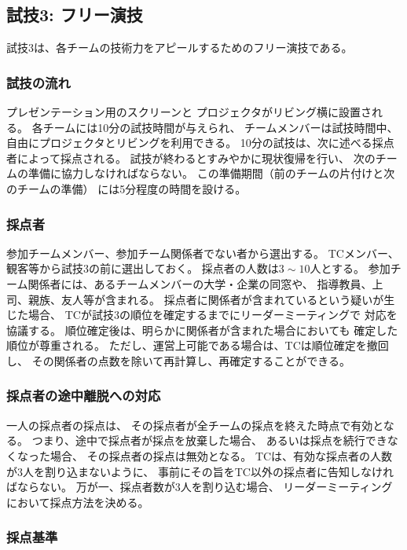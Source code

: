 \documentclass[a4j]{jarticle}
\begin{document}
\subsection{試技3: フリー演技}

試技3は、各チームの技術力をアピールするためのフリー演技である。

\subsubsection{試技の流れ}

プレゼンテーション用のスクリーンと
プロジェクタがリビング横に設置される。
各チームには10分の試技時間が与えられ、
チームメンバーは試技時間中、
自由にプロジェクタとリビングを利用できる。
10分の試技は、次に述べる採点者によって採点される。
試技が終わるとすみやかに現状復帰を行い、
次のチームの準備に協力しなければならない。
この準備期間（前のチームの片付けと次のチームの準備）
には5分程度の時間を設ける。

\subsubsection{採点者}

参加チームメンバー、参加チーム関係者でない者から選出する。
TCメンバー、観客等から試技3の前に選出しておく。
採点者の人数は$3\sim10$人とする。
参加チーム関係者には、あるチームメンバーの大学・企業の同窓や、
指導教員、上司、親族、友人等が含まれる。
採点者に関係者が含まれているという疑いが生じた場合、
TCが試技3の順位を確定するまでにリーダーミーティングで
対応を協議する。
順位確定後は、明らかに関係者が含まれた場合においても
確定した順位が尊重される。
ただし、運営上可能である場合は、TCは順位確定を撤回し、
その関係者の点数を除いて再計算し、再確定することができる。

\subsubsection{採点者の途中離脱への対応}

一人の採点者の採点は、
その採点者が全チームの採点を終えた時点で有効となる。
つまり、途中で採点者が採点を放棄した場合、
あるいは採点を続行できなくなった場合、
その採点者の採点は無効となる。
TCは、有効な採点者の人数が$3$人を割り込まないように、
事前にその旨をTC以外の採点者に告知しなければならない。
万が一、採点者数が$3$人を割り込む場合、
リーダーミーティングにおいて採点方法を決める。

\subsubsection{採点基準}
\end{document}
